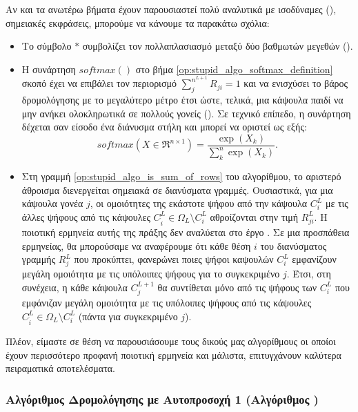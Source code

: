 {\begin{algorithm}[h]
\begin{algorithmic}[1]
  \end{algorithmic}
  \end{algorithm}
}


Αν και τα ανωτέρω βήματα έχουν παρουσιαστεί πολύ αναλυτικά με ισοδύναμες (), σημειακές εκφράσεις, μπορούμε να κάνουμε τα παρακάτω σχόλια:
\begin{itemize}
  \item Το σύμβολο $\ast$ συμβολίζει τον πολλαπλασιασμό μεταξύ δύο βαθμωτών μεγεθών ().
  \item Η συνάρτηση $softmax()$ στο βήμα \ref{op:stupid_algo_softmax_definition} σκοπό έχει να επιβάλει τον περιορισμό $\sum_j^{n^{L+1}} R_{ji} = 1$ και να ενισχύσει το βάρος δρομολόγησης με το μεγαλύτερο μέτρο έτσι ώστε, τελικά, μια κάψουλα παιδί να μην ανήκει ολοκληρωτικά σε πολλούς γονείς (). Σε τεχνικό επίπεδο, η συνάρτηση δέχεται σαν είσοδο ένα διάνυσμα στήλη και μπορεί να οριστεί ως εξής:
  \begin{equation}
    \label{eq:softmax_algorithm}
    \mathit{softmax}(X \in \Re^{n \times 1}) = \frac{\exp(X_k)}{\sum_k^n \exp(X_k)}.
  \end{equation}
  \item Στη γραμμή \ref{op:stupid_algo_is_sum_of_rows} του αλγορίθμου, το αριστερό άθροισμα διενεργείται σημειακά σε διανύσματα γραμμές. Ουσιαστικά, για μια κάψουλα γονέα $j$, οι ομοιότητες της εκάστοτε ψήφου από την κάψουλα $C_i^L$ με τις άλλες ψήφους από τις κάψουλες $C_{\acute{i}}^L \in \Omega_L \setminus C_i^L$ αθροίζονται στην τιμή $R_{ji}^L$. Η ποιοτική ερμηνεία αυτής της πράξης δεν αναλύεται στο έργο \cite{mazzia2021efficient}. Σε μια προσπάθεια ερμηνείας, θα μπορούσαμε να αναφέρουμε ότι κάθε θέση $i$ του διανύσματος γραμμής $R_j^L$ που προκύπτει, φανερώνει ποιες ψήφοι καψουλών $C_i^L$ εμφανίζουν μεγάλη ομοιότητα με τις υπόλοιπες ψήφους για το συγκεκριμένο $j$. Έτσι, στη συνέχεια, η κάθε κάψουλα $C_j^{L+1}$ θα συντίθεται μόνο από τις ψήφους των $C_{i}^L$ που εμφάνιζαν μεγάλη ομοιότητα με τις υπόλοιπες ψήφους από τις κάψουλες $C_{\acute{i}}^L \in \Omega_L \setminus C_i^L$ (πάντα για συγκεκριμένο $j$).
\end{itemize}

Πλέον, είμαστε σε θέση να παρουσιάσουμε τους δικούς μας αλγορίθμους οι οποίοι έχουν περισσότερο προφανή ποιοτική ερμηνεία και μάλιστα, επιτυγχάνουν καλύτερα πειραματικά αποτελέσματα.

\subsubsection{Αλγόριθμος Δρομολόγησης με Αυτο\textendash προσοχή 1 (Αλγόριθμος )}


